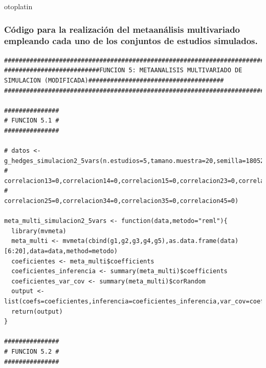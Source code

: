 otoplatin\documentclass[a4paper,openright,12pt]{report}
\begin{document}
\subsubsection{Código para la realización del metaanálisis multivariado empleando cada uno de los conjuntos de estudios simulados.}
{\tiny
\begin{verbatim}
##############################################################################################################################
##########################FUNCION 5: METAANALISIS MULTIVARIADO DE SIMULACION (MODIFICADA)#####################################
##############################################################################################################################

###############
# FUNCION 5.1 #
###############

# datos <- g_hedges_simulacion2_5vars(n.estudios=5,tamano.muestra=20,semilla=18052013,replicaciones=5,correlacion12=0,
#                                     correlacion13=0,correlacion14=0,correlacion15=0,correlacion23=0,correlacion24=0,
#                                     correlacion25=0,correlacion34=0,correlacion35=0,correlacion45=0)

meta_multi_simulacion2_5vars <- function(data,metodo="reml"){
  library(mvmeta)
  meta_multi <- mvmeta(cbind(g1,g2,g3,g4,g5),as.data.frame(data)[6:20],data=data,method=metodo)
  coeficientes <- meta_multi$coefficients
  coeficientes_inferencia <- summary(meta_multi)$coefficients
  coeficientes_var_cov <- summary(meta_multi)$corRandom
  output <- list(coefs=coeficientes,inferencia=coeficientes_inferencia,var_cov=coeficientes_var_cov)
  return(output)
}

###############
# FUNCION 5.2 #
###############


\end{verbatim}}
\end{document}
